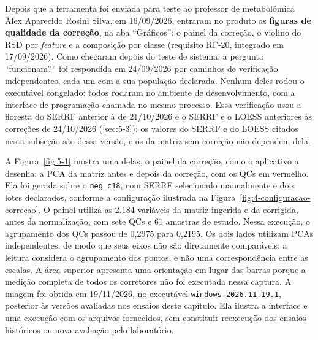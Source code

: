 Depois que a ferramenta foi enviada para teste ao professor de metabolômica Álex Aparecido Rosini Silva, em 16/09/2026, entraram no produto as \textbf{figuras de qualidade da correção}, na aba ``Gráficos'': o painel da correção, o violino do RSD por \textit{feature} e a composição por classe (requisito RF-20, integrado em 17/09/2026). Como chegaram depois do teste de sistema, a pergunta ``funcionam?'' foi respondida em 24/09/2026 por caminhos de verificação independentes, cada um com a sua população declarada. Nenhum deles rodou o executável congelado: todos rodaram no ambiente de desenvolvimento, com a interface de programação chamada no mesmo processo. Essa verificação usou a floresta do SERRF anterior à de 21/10/2026 e o SERRF e o LOESS anteriores às correções de 24/10/2026 (\ref{sec:5-3}): os valores do SERRF e do LOESS citados nesta subseção são dessa versão, e os da matriz sem correção não dependem dela.


A Figura~\ref{fig:5-1} mostra uma delas, o painel da correção, como o aplicativo a desenha: a PCA da matriz antes e depois da correção, com os QCs em vermelho. Ela foi gerada sobre o \texttt{neg\_\allowbreak{}c18}, com SERRF selecionado manualmente e dois lotes declarados, conforme a configuração ilustrada na Figura~\ref{fig:4-configuracao-correcao}. O painel utiliza as 2.184 variáveis da matriz ingerida e da corrigida, antes da normalização, com sete QCs e 61 amostras de estudo. Nessa execução, o agrupamento dos QCs passou de 0,2975 para 0,2195. Os dois lados utilizam PCAs independentes, de modo que seus eixos não são diretamente comparáveis; a leitura considera o agrupamento dos pontos, e não uma correspondência entre as escalas. A área superior apresenta uma orientação em lugar das barras porque a medição completa de todos os corretores não foi executada nessa captura. A imagem foi obtida em 19/11/2026, no executável \texttt{windows-\allowbreak{}2026.\allowbreak{}11.\allowbreak{}19.\allowbreak{}1}, posterior às versões avaliadas nos ensaios deste capítulo. Ela ilustra a interface e uma execução com os arquivos fornecidos, sem constituir reexecução dos ensaios históricos ou nova avaliação pelo laboratório.

